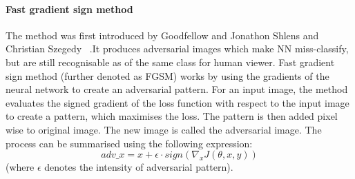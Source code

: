 \paragraph{Fast gradient sign method}
The method was first introduced by Goodfellow and Jonathon Shlens and Christian Szegedy
~\cite{goodfellow2015explaining}.It produces adversarial images which make NN miss-classify,
but are still recognisable as of the same class for human viewer.
Fast gradient sign method (further denoted as FGSM) works by using the gradients of the neural network to create an adversarial pattern.
For an input image, the method evaluates the signed gradient of the loss function with respect to the input image to create a pattern,
which maximises the loss.
The pattern is then added pixel wise to original image.
The new image is called the adversarial image.
The process can be summarised using the following expression:
\begin{equation}
    adv\_x = x + \epsilon \cdot sign(\nabla_x J(\theta, x, y))
\end{equation}
(where $\epsilon$ denotes the intensity of adversarial pattern).
\\

